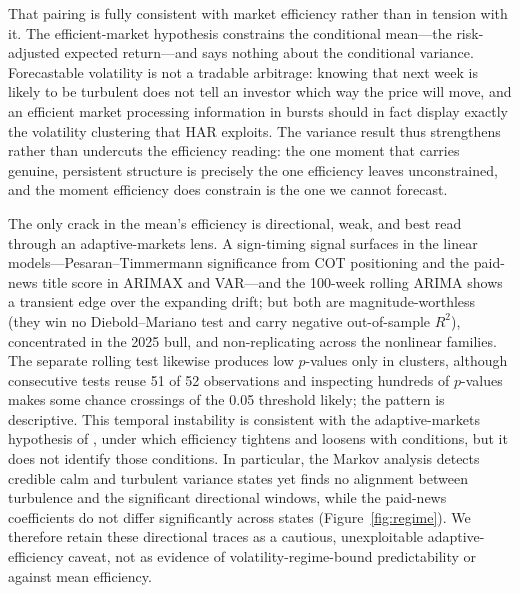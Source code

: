 \documentclass[12pt, a4paper]{article}
\begin{document}
That pairing is fully consistent with market efficiency rather than in tension with it. The
efficient-market hypothesis \parencite{fama1970,fama1991} constrains the conditional mean---the
risk-adjusted expected return---and says nothing about the conditional variance. Forecastable
volatility is not a tradable arbitrage: knowing that next week is likely to be turbulent does not
tell an investor which way the price will move, and an efficient market processing information in
bursts should in fact display exactly the volatility clustering that HAR exploits. The variance
result thus strengthens rather than undercuts the efficiency reading: the one moment that carries
genuine, persistent structure is precisely the one efficiency leaves unconstrained, and the
moment efficiency does constrain is the one we cannot forecast.

The only crack in the mean's efficiency is directional, weak, and best read through an
adaptive-markets lens. A sign-timing signal surfaces in the linear models---Pesaran--Timmermann
significance from COT positioning and the paid-news title score in ARIMAX and VAR---and the
100-week rolling ARIMA shows a transient edge over the expanding drift; but both are
magnitude-worthless (they win no Diebold--Mariano test and carry negative out-of-sample
\(R^2\)), concentrated in the 2025 bull, and non-replicating across the nonlinear families.
The separate rolling test likewise produces low \(p\)-values only in clusters, although
consecutive tests reuse 51 of 52 observations and inspecting hundreds of \(p\)-values makes
some chance crossings of the 0.05 threshold likely; the pattern is descriptive.
This temporal instability is consistent with the adaptive-markets hypothesis of
\textcite{lo2004}, under which efficiency tightens and loosens with conditions, but it does not
identify those conditions. In particular, the Markov analysis detects credible calm and
turbulent variance states yet finds no alignment between turbulence and the significant
directional windows, while the paid-news coefficients do not differ significantly across states
(Figure~\ref{fig:regime}). We therefore retain these directional traces as a cautious,
unexploitable adaptive-efficiency caveat, not as evidence of volatility-regime-bound
predictability or against mean efficiency.
\end{document}
